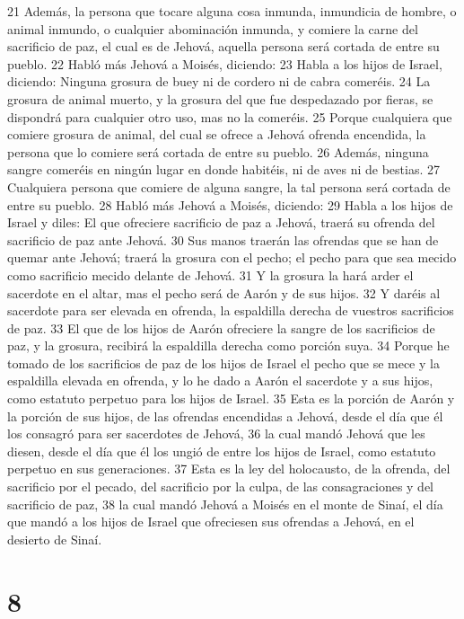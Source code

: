 21 Además, la persona que tocare alguna cosa inmunda, inmundicia de hombre, o animal inmundo, o cualquier abominación inmunda, y comiere la carne del sacrificio de paz, el cual es de Jehová, aquella persona será cortada de entre su pueblo.
22 Habló más Jehová a Moisés, diciendo:
23 Habla a los hijos de Israel, diciendo: Ninguna grosura de buey ni de cordero ni de cabra comeréis.
24 La grosura de animal muerto, y la grosura del que fue despedazado por fieras, se dispondrá para cualquier otro uso, mas no la comeréis.
25 Porque cualquiera que comiere grosura de animal, del cual se ofrece a Jehová ofrenda encendida, la persona que lo comiere será cortada de entre su pueblo.
26 Además, ninguna sangre comeréis en ningún lugar en donde habitéis, ni de aves ni de bestias.
27 Cualquiera persona que comiere de alguna sangre, la tal persona será cortada de entre su pueblo.
28 Habló más Jehová a Moisés, diciendo:
29 Habla a los hijos de Israel y diles: El que ofreciere sacrificio de paz a Jehová, traerá su ofrenda del sacrificio de paz ante Jehová.
30 Sus manos traerán las ofrendas que se han de quemar ante Jehová; traerá la grosura con el pecho; el pecho para que sea mecido como sacrificio mecido delante de Jehová.
31 Y la grosura la hará arder el sacerdote en el altar, mas el pecho será de Aarón y de sus hijos.
32 Y daréis al sacerdote para ser elevada en ofrenda, la espaldilla derecha de vuestros sacrificios de paz.
33 El que de los hijos de Aarón ofreciere la sangre de los sacrificios de paz, y la grosura, recibirá la espaldilla derecha como porción suya.
34 Porque he tomado de los sacrificios de paz de los hijos de Israel el pecho que se mece y la espaldilla elevada en ofrenda, y lo he dado a Aarón el sacerdote y a sus hijos, como estatuto perpetuo para los hijos de Israel.
35 Esta es la porción de Aarón y la porción de sus hijos, de las ofrendas encendidas a Jehová, desde el día que él los consagró para ser sacerdotes de Jehová,
36 la cual mandó Jehová que les diesen, desde el día que él los ungió de entre los hijos de Israel, como estatuto perpetuo en sus generaciones.
37 Esta es la ley del holocausto, de la ofrenda, del sacrificio por el pecado, del sacrificio por la culpa, de las consagraciones y del sacrificio de paz,
38 la cual mandó Jehová a Moisés en el monte de Sinaí, el día que mandó a los hijos de Israel que ofreciesen sus ofrendas a Jehová, en el desierto de Sinaí. 

\chapter{8}


